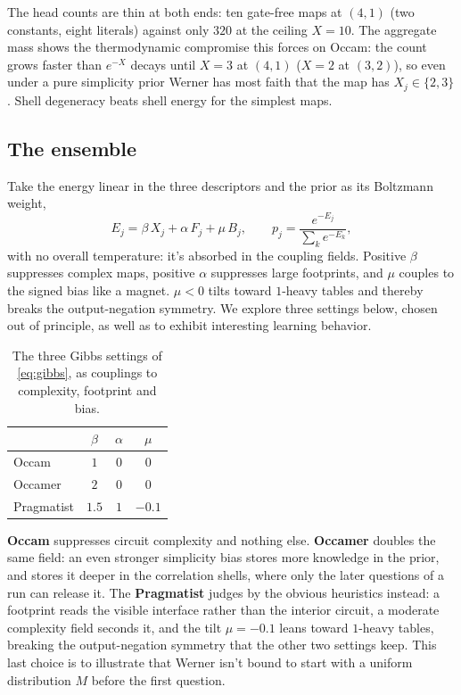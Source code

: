 \documentclass[11pt]{article}
\begin{document}
The head counts are thin at both ends: ten gate-free maps at $(4,1)$
(two constants, eight literals) against only $320$ at the ceiling
$X = 10$. The aggregate mass shows the thermodynamic compromise this
forces on Occam: the count grows faster than $e^{-X}$ decays until
$X = 3$ at $(4,1)$ ($X = 2$ at $(3,2)$), so even under a pure
simplicity prior Werner has most faith that the map has $X_j \in \{2,3\}$.
Shell degeneracy beats shell energy for the simplest maps.

\subsection{The ensemble}\label{sec:gibbsensemble}

Take the energy linear in the three descriptors and the prior as its
Boltzmann weight,
%
\begin{equation}
E_j = \beta\, X_j + \alpha\, F_j + \mu\, B_j,
\qquad
p_j = \frac{e^{-E_j}}{\sum_k e^{-E_k}},
\label{eq:gibbs}
\end{equation}
%
with no overall temperature: it's absorbed in the coupling fields. Positive
$\beta$ suppresses complex maps, positive $\alpha$ suppresses large
footprints, and $\mu$ couples to the signed bias like a magnet. $\mu < 0$ tilts
toward $1$-heavy tables and thereby breaks the output-negation
symmetry. We explore three settings below, chosen out of principle, as well as to exhibit
interesting learning behavior.

\begin{table}[H]
\begin{center}
\begin{tabular}{lccc}
\toprule
 & $\beta$ & $\alpha$ & $\mu$ \\
\midrule
Occam      & $1$   & $0$ & $0$    \\
Occamer    & $2$   & $0$ & $0$    \\
Pragmatist & $1.5$ & $1$ & $-0.1$ \\
\bottomrule
\end{tabular}
\end{center}
\caption{The three Gibbs settings of \eqref{eq:gibbs}, as couplings to complexity, footprint and bias.}
\label{tab:gibbssettings}
\end{table}

\textbf{Occam} suppresses circuit complexity and nothing else.
\textbf{Occamer} doubles the same field: an even stronger simplicity
bias stores more knowledge in the prior, and stores it deeper in the
correlation shells, where only the later questions of a run can
release it. The \textbf{Pragmatist} judges by the obvious heuristics
instead: a footprint reads the visible interface rather
than the interior circuit, a moderate complexity field seconds it,
and the tilt $\mu = -0.1$ leans toward $1$-heavy tables, breaking
the output-negation symmetry that the other two settings keep. This last choice is to illustrate
that Werner isn't bound to start with a uniform distribution $M$ before the first question.
\end{document}
